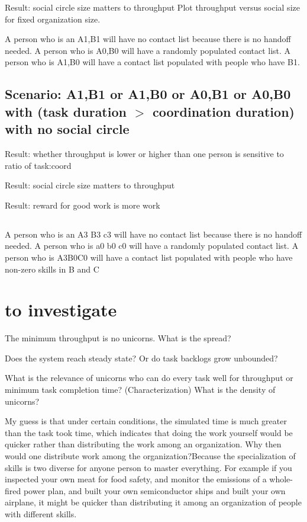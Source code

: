 Result: social circle size matters to throughput 
Plot throughput versus social size for fixed organization size.

A person who is an A1,B1 will have no contact list because there is no handoff needed. A person who is A0,B0 will have a randomly populated contact list. A person who is A1,B0 will have a contact list populated with people who have B1.




\subsection*{Scenario: A1,B1 or A1,B0 or A0,B1 or A0,B0\\with (task duration $>$ coordination duration)\\with no social circle}

Result: whether throughput is lower or higher than one person is sensitive to ratio of task:coord

Result: social circle size matters to throughput 

Result: reward for good work is more work 

\subsection*{}

A person who is an A3 B3 c3 will have no contact list because there is no handoff needed. A person who is a0 b0 c0 will have a randomly populated contact list. A person who is A3B0C0 will have a contact list populated with people who have non-zero skills in B and C

\section{to investigate}

The minimum throughput is no unicorns. What is the spread?

Does the system reach steady state? 
Or do task backlogs grow unbounded?

What is the relevance of unicorns who can do every task well for throughput or minimum task completion time?
(Characterization) What is the density of unicorns?



My guess is that under certain conditions, the simulated time is much greater than the task took time, which indicates that doing the work yourself would be quicker rather than distributing the work among an organization.
Why then would one distribute work among the organization?Because the specialization of skills is two diverse for anyone person to master everything. For example if you inspected your own meat for food safety, and monitor the emissions of a whole-fired power plan, and built your own semiconductor ships and built your own airplane, it might be quicker than distributing it among an organization of people with different skills.


